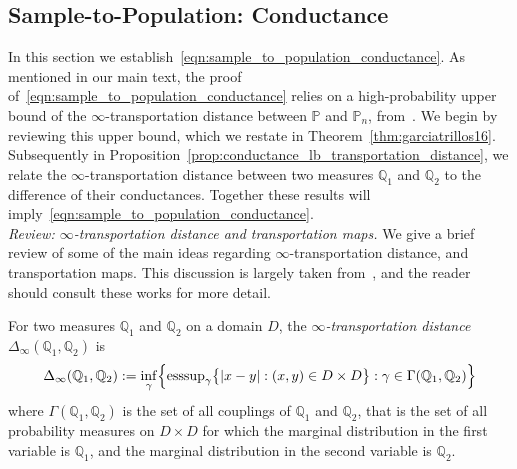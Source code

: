 \documentclass[twoside,11pt]{article}
\newcommand{\1}{\mathbf{1}}
\newcommand{\mbb}[1]{\mathbb{#1}}
\begin{document}
\subsection{Sample-to-Population: Conductance}
\label{subsec:sample_to_population_conductance}

In this section we establish~\eqref{eqn:sample_to_population_conductance}. As mentioned in our main text, the proof of~\eqref{eqn:sample_to_population_conductance} relies on a high-probability upper bound of the $\infty$-transportation distance between $\mbb{P}$ and $\mbb{P}_n$, from~\citep{garciatrillos16b}. We begin by reviewing this upper bound, which we restate in Theorem~\ref{thm:garciatrillos16}. Subsequently in Proposition~\ref{prop:conductance_lb_transportation_distance}, we relate the $\infty$-transportation distance between two measures $\mbb{Q}_1$ and $\mbb{Q}_2$ to the difference of their conductances. Together these results will imply~\eqref{eqn:sample_to_population_conductance}.\\

\noindent \emph{Review: $\infty$-transportation distance and transportation maps.}
We give a brief review of some of the main ideas regarding $\infty$-transportation distance, and transportation maps. This discussion is largely taken from~\citep{garciatrillos16b,garciatrillos16}, and the reader should consult these works for more detail. 

For two measures $\mbb{Q}_1$ and $\mbb{Q}_2$ on a domain $D$, the \emph{$\infty$-transportation distance} $\Delta_{\infty}(\mbb{Q}_1,\mbb{Q}_2)$ is
\begin{equation*}
\Delta_{\infty}(\mbb{Q}_1,\mbb{Q}_2) := \inf_{\gamma}\Bigl\{\mathrm{ess sup}_{\gamma} \bigl\{|x - y|: (x,y) \in D \times D\bigr\}: \gamma \in \Gamma(\mbb{Q}_1,\mbb{Q}_2) \Bigr\}
\end{equation*}
where $\Gamma(\mbb{Q}_1,\mbb{Q}_2)$ is the set of all couplings of $\mbb{Q}_1$ and $\mbb{Q}_2$, that is the set of all probability measures on $D \times D$ for which the marginal distribution in the first variable is $\mbb{Q}_1$, and the marginal distribution in the second variable is $\mbb{Q}_2$. 
\end{document}
